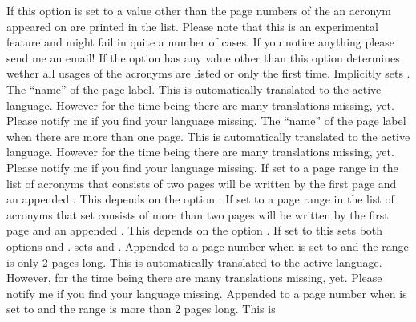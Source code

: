 \documentclass[load-preamble+]{cnltx-doc}
\begin{document}
\begin{options}
    If this option is set to a value other than  the page numbers
    of the an acronym appeared on are printed in the list.  Please note that
    this is an experimental feature and might fail in quite a number of cases.
    If you notice anything please send me an email!
    If the option  has any value other than 
    this option determines wether all usages of the acronyms are listed or
    only the first time.  Implicitly sets .
    The ``name'' of the page label.  This is automatically translated to the
    active language. However for the time being there are many translations
    missing, yet.  Please notify me if you find your language missing.
    The ``name'' of the page label when there are more than one page.  This is
    automatically translated to the active language.  However for the time
    being there are many translations missing, yet.  Please notify me if you
    find your language missing. 
    If set to  a page range in the list of acronyms that consists
    of two pages will be written by the first page and an appended
    . This depends on the option . 
    If set to  a page range in the list of acronyms that set
    consists of more than two pages will be written by the first page and an
    appended . This depends on the option .
    If set to  this sets both options
     and .
     sets  and
    .
    Appended to a page number when  is set to
     and the range is only 2 pages long.  This is automatically
    translated to the active language.  However, for the time being there are
    many translations missing, yet.  Please notify me if you find your
    language missing.
    Appended to a page number when  is set to
     and the range is more than 2 pages long.  This is

\end{options}
\end{document}
